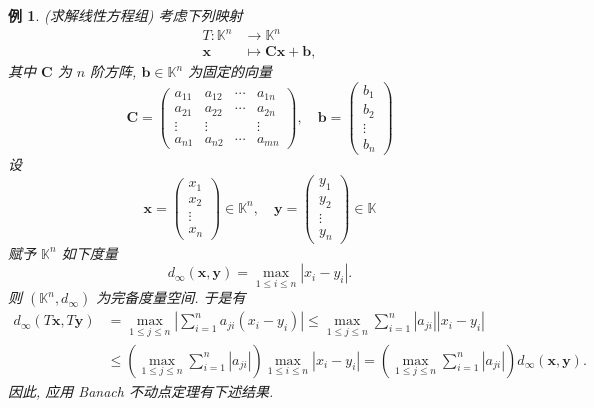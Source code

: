 \documentclass[openany]{ctexbook}
\theoremstyle{kaiti}
\theoremstyle{normal}
\newtheorem{example}{例}[section]
\begin{document}
\begin{example}
(求解线性方程组) 考虑下列映射
\begin{equation}
  \begin{aligned}
    T: \mathbb{K}^n &\rightarrow \mathbb{K}^n \\
    \boldsymbol{x} &\mapsto \boldsymbol{C} \boldsymbol{x}+\boldsymbol{b},
  \end{aligned}
\end{equation}
其中 $\boldsymbol{C}$ 为 $n$ 阶方阵, $\boldsymbol{b} \in \mathbb{K}^n$ 为固定的向量
$$
\boldsymbol{C}=\left(\begin{array}{cccc}
a_{11} & a_{12} & \cdots & a_{1 n} \\
a_{21} & a_{22} & \cdots & a_{2 n} \\
\vdots & \vdots & & \vdots \\
a_{n 1} & a_{n 2} & \cdots & a_{m n}
\end{array}\right), \quad \boldsymbol{b}=\left(\begin{array}{c}
b_1 \\
b_2 \\
\vdots \\
b_n
\end{array}\right)
$$
设
$$
\boldsymbol{x}=\left(\begin{array}{c}
x_1 \\
x_2 \\
\vdots \\
x_n
\end{array}\right) \in \mathbb{K}^n, \quad \boldsymbol{y}=\left(\begin{array}{c}
y_1 \\
y_2 \\
\vdots \\
y_n
\end{array}\right) \in \mathbb{K}
$$
赋予 $\mathbb{K}^n$ 如下度量
$$
d_{\infty}(\boldsymbol{x}, \boldsymbol{y})=\max_{1 \leqslant i \leqslant n}\left|x_{i}-y_{i}\right|.
$$
则 $\left(\mathbb{K}^n, d_{\infty}\right)$ 为完备度量空间. 于是有
$$
  \begin{aligned}
    d_{\infty}(T \boldsymbol{x}, T \boldsymbol{y}) &=\max_{1 \leqslant j \leqslant n}\left|\sum_{i=1}^n a_{j i}\left(x_{i}-y_{i}\right)\right| \leqslant \max_{1 \leqslant j \leqslant n} \sum_{i=1}^n\left|a_{j i}\right|\left|x_{i}-y_{i}\right| \\
    & \leqslant\left(\max_{1 \leqslant j \leqslant n} \sum_{i=1}^n\left|a_{j i}\right|\right) \max_{1 \leqslant i \leqslant n}\left|x_{i}-y_{i}\right|=\left(\max_{1 \leqslant j \leqslant n} \sum_{i=1}^n\left|a_{j i}\right|\right) d_{\infty}(\boldsymbol{x}, \boldsymbol{y}).
  \end{aligned}
$$
因此, 应用 Banach 不动点定理有下述结果.
\end{example}
\end{document}
